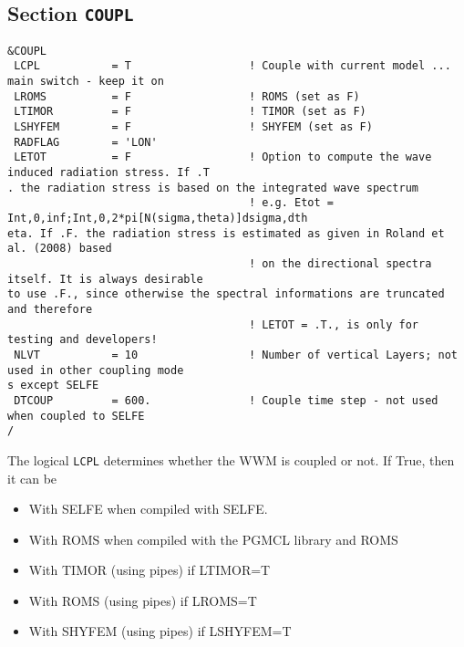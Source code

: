 \documentclass[12pt]{amsart}
\begin{document}
\subsection{Section {\tt COUPL}}
\begin{verbatim}
&COUPL
 LCPL           = T                  ! Couple with current model ... main switch - keep it on
 LROMS          = F                  ! ROMS (set as F)
 LTIMOR         = F                  ! TIMOR (set as F)
 LSHYFEM        = F                  ! SHYFEM (set as F)
 RADFLAG        = 'LON'
 LETOT          = F                  ! Option to compute the wave induced radiation stress. If .T
. the radiation stress is based on the integrated wave spectrum
                                     ! e.g. Etot = Int,0,inf;Int,0,2*pi[N(sigma,theta)]dsigma,dth
eta. If .F. the radiation stress is estimated as given in Roland et al. (2008) based
                                     ! on the directional spectra itself. It is always desirable 
to use .F., since otherwise the spectral informations are truncated and therefore
                                     ! LETOT = .T., is only for testing and developers!
 NLVT           = 10                 ! Number of vertical Layers; not used in other coupling mode
s except SELFE
 DTCOUP         = 600.               ! Couple time step - not used when coupled to SELFE
/
\end{verbatim}
The logical {\tt LCPL} determines whether the WWM is coupled or not. If True, then it can be
\begin{itemize}
\item With SELFE when compiled with SELFE.
\item With ROMS when compiled with the PGMCL library and ROMS
\item With TIMOR (using pipes) if LTIMOR=T
\item With ROMS (using pipes) if LROMS=T
\item With SHYFEM (using pipes) if LSHYFEM=T
\end{itemize}
\end{document}
